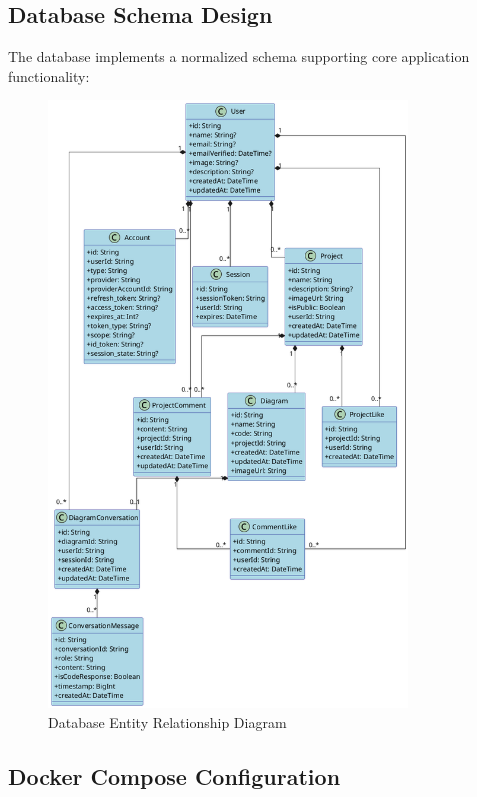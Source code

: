 \subsection{Database Schema Design}

The database implements a normalized schema supporting core application functionality:

\begin{figure}[H]
  \centering
  \includegraphics[width=0.85\textwidth]{conception/SprintI/global_class_diagram.png}
  \caption{Database Entity Relationship Diagram}
  \label{fig:database_schema}
\end{figure}

\subsection{Docker Compose Configuration}

